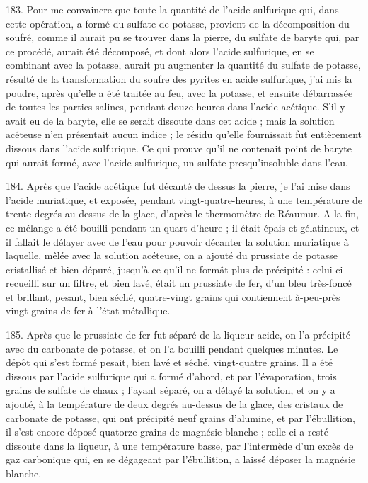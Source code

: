 \documentclass[a4paper, 11pt, oneside, polutonikogreek, french]{article}
\begin{document}
183. Pour me convaincre que toute la quantité de l'acide sulfurique qui, dans cette opération, a formé du sulfate de potasse, provient de la décomposition du soufré, comme il aurait pu se trouver dans la pierre, du sulfate de baryte qui, par ce procédé, aurait été décomposé, et dont alors l'acide sulfurique, en se combinant avec la potasse, aurait pu augmenter la quantité du sulfate de potasse, résulté de la transformation du soufre des pyrites en acide sulfurique, j'ai mis la poudre, après qu'elle a été traitée au feu, avec la potasse, et ensuite débarrassée de toutes les parties salines, pendant douze heures dans l'acide acétique. S'il y avait eu de la baryte, elle se serait dissoute dans cet acide ; mais la solution acéteuse n'en présentait aucun indice ; le résidu qu'elle fournissait fut entièrement dissous dans l'acide sulfurique. Ce qui prouve qu'il ne contenait point de baryte qui aurait formé, avec l'acide sulfurique, un sulfate presqu'insoluble dans l'eau.

184. Après que l'acide acétique fut décanté de dessus la pierre, je l'ai mise dans l'acide muriatique, et exposée, pendant vingt-quatre-heures, à une température de trente degrés au-dessus de la glace, d'après le thermomètre de Réaumur. A la fin, ce mélange a été bouilli pendant un quart d'heure ; il était épais et gélatineux, et il fallait le délayer avec de l'eau pour pouvoir décanter la solution muriatique à laquelle, mêlée avec la solution acéteuse, on a ajouté du prussiate de potasse cristallisé et bien dépuré, jusqu'à ce qu'il ne formât plus de précipité : celui-ci recueilli sur un filtre, et bien lavé, était un prussiate de fer, d'un bleu très-foncé et brillant, pesant, bien séché, quatre-vingt grains qui contiennent à-peu-près vingt grains de fer à l'état métallique.

185. Après que le prussiate de fer fut séparé de la liqueur acide, on l'a précipité avec du carbonate de potasse, et on l'a bouilli pendant quelques minutes. Le dépôt qui s'est formé pesait, bien lavé et séché, vingt-quatre grains. Il a été dissous par l'acide sulfurique qui a formé d'abord, et par l'évaporation, trois grains de sulfate de chaux ; l'ayant séparé, on a délayé la solution, et on y a ajouté, à la température de deux degrés au-dessus de la glace, des cristaux de carbonate de potasse, qui ont précipité neuf grains d'alumine, et par l'ébullition, il s'est encore déposé quatorze grains de magnésie blanche ; celle-ci a resté dissoute dans la liqueur, à une température basse, par l'intermède d'un excès de gaz carbonique qui, en se dégageant par l'ébullition, a laissé déposer la magnésie blanche.
\end{document}
